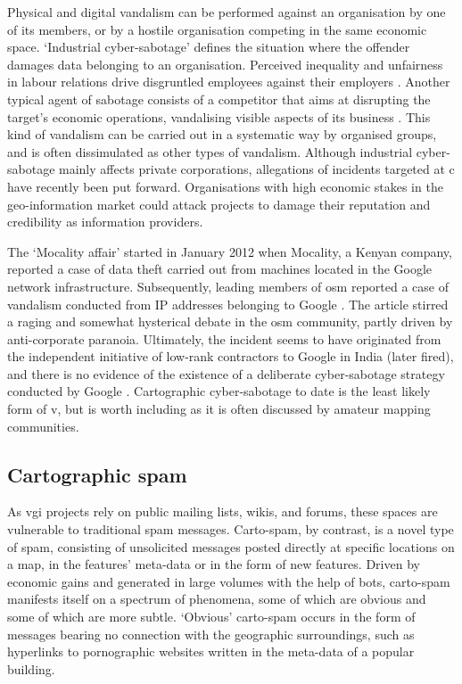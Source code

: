 \documentclass{article} \usepackage{graphicx,xspace}
\begin{document}
Physical and digital vandalism can be performed against an organisation by one of its members, or by a hostile organisation competing in the same economic space. 
`Industrial cyber-sabotage' defines the situation where the offender damages data belonging to an organisation.
Perceived inequality and unfairness in labour relations drive disgruntled employees against their employers \citep{fisher:1982:equity}.
Another typical agent of sabotage consists of a competitor that aims at disrupting the target's economic operations, vandalising visible aspects of its business \citep{bayuk:2010:cyberforensics}.
This kind of vandalism can be carried out in a systematic way by organised groups, and is often dissimulated as other types of vandalism.
Although industrial cyber-sabotage mainly affects private corporations, allegations of incidents targeted at \gls{c} have recently been put forward.
Organisations with high economic stakes in the geo-information market could attack projects to damage their reputation and credibility as information providers.

The `Mocality affair' started in January 2012 when Mocality, a Kenyan company, reported a case of data theft carried out from machines located in the Google network infrastructure.
Subsequently, leading members of \gls{osm} reported a case of vandalism conducted from IP addresses belonging to Google \citep{maron:2012:googlevandals}.
The article stirred a raging and somewhat hysterical debate in the \gls{osm} community, partly driven by anti-corporate paranoia.
Ultimately, the incident seems to have originated from the independent initiative of low-rank contractors to Google in India (later fired), and there is no evidence of the existence of a deliberate cyber-sabotage strategy conducted by Google \citep{sottek:2010:googlevandal}.
Cartographic cyber-sabotage to date is the least likely form of \gls{v}, but is worth including as it is often discussed by amateur mapping communities.

\subsection{Cartographic spam}

As \gls{vgi} projects rely on public mailing lists, wikis, and forums, these spaces are vulnerable to traditional spam messages.
Carto-spam, by contrast, is a novel type of spam, consisting of unsolicited messages posted directly at specific locations on a map, in the features' meta-data or in the form of new features.
Driven by economic gains and generated in large volumes with the help of bots, carto-spam manifests itself on a spectrum of phenomena, some of which are obvious and some of which are more subtle.
`Obvious' carto-spam occurs in the form of messages bearing no connection with the geographic surroundings, such as hyperlinks to pornographic websites written in the meta-data of a popular building.  
\end{document}
